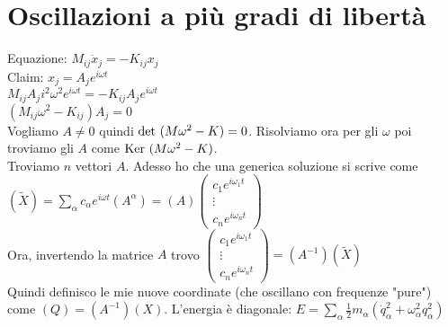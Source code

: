 \documentclass[a4paper,NoNotes,GeneralMath,12pt]{stdmdoc}
\begin{document}
	\section*{Oscillazioni a più gradi di libertà}
	Equazione: $M_{ij} \ddot{x}_j = -K_{ij} x_j$ \\
	Claim: $x_j = A_j e^{i\omega t}$ \\
	$M_{ij} A_j i^2 \omega^2 e^{i\omega t} = - K_{ij} A_{j} e^{i\omega t}$ \\
	$\left(M_{ij} \omega^2 - K_{ij} \right) A_j = 0$ \\
	Vogliamo $A \neq 0$ quindi $\mbox{det } (M\omega^2 - K) = 0$. Risolviamo ora per gli $\omega$ poi troviamo gli $A$ come $\mbox{Ker } (M\omega^2 - K )$. \\
	Troviamo $n$ vettori $A$. Adesso ho che una generica soluzione si scrive come $\left(\tilde{X}\right) = \sum_\alpha c_\alpha e^{i\omega t} \left( A^\alpha \right) = \left( A \right) \left( \begin{array}{c} c_1 e^{i\omega_1 t} \\ \vdots \\ c_n e^{i\omega_n t} \end{array} \right)$ \\
	Ora, invertendo la matrice $A$ trovo $\left( \begin{array}{c} c_1 e^{i\omega_1 t} \\ \vdots \\ c_n e^{i\omega_n t} \end{array} \right) = \left( A^{-1} \right) \left( \tilde{X} \right)$ \\
	Quindi definisco le mie nuove coordinate (che oscillano con frequenze "pure") come $\left( Q \right) = \left( A^{-1} \right) \left( X \right)$. L'energia è diagonale: $E = \sum_\alpha \frac{1}{2} m_\alpha ({\dot{q}_\alpha^2} + \omega_\alpha^2 q_\alpha^2 )$
\end{document}
